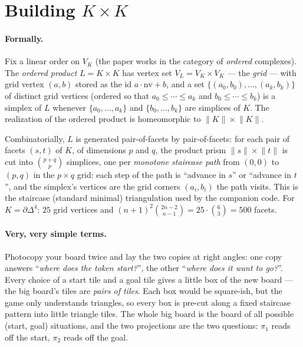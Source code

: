 \documentclass[11pt]{article}
\theoremstyle{definition}
\begin{document}
\section{Building $K \times K$}
\label{sec:product}

\paragraph{Formally.}
Fix a linear order on $V_K$ (the paper works in the category of \emph{ordered}
complexes). The \emph{ordered product} $L = K\times K$ has vertex set
$V_L = V_K \times V_K$ --- the \emph{grid} --- with grid vertex $(a,b)$ stored
as the id $a\cdot\mathrm{nv}+b$, and a set
$\{(a_0,b_0), \dots, (a_k,b_k)\}$ of distinct grid vertices (ordered so that
$a_0 \leq \cdots \leq a_k$ and $b_0 \leq \cdots \leq b_k$) is a simplex of $L$
whenever $\{a_0,\dots,a_k\}$ and $\{b_0,\dots,b_k\}$ are simplices of $K$. The
realization of the ordered product is homeomorphic to
$\lVert K\rVert \times \lVert K\rVert$.

Combinatorially, $L$ is generated pair-of-facets by pair-of-facets: for each
pair of facets $(s, t)$ of $K$, of dimensions $p$ and $q$, the product prism
$\lVert s\rVert \times \lVert t\rVert$ is cut into
$\binom{p+q}{p}$ simplices, one per \emph{monotone staircase path} from
$(0,0)$ to $(p,q)$ in the $p\times q$ grid: each step of the path is
``advance in $s$'' or ``advance in $t$'', and the simplex's vertices are the
grid corners $(a_i, b_i)$ the path visits. This is the staircase (standard
minimal) triangulation used by the companion code. For $K = \partial\Delta^4$:
$25$ grid vertices and
$(n{+}1)^2\binom{2n-2}{n-1} = 25\cdot\binom{6}{3} = 500$ facets.

\paragraph{Very, very simple terms.}
Photocopy your board twice and lay the two copies at right angles: one copy
answers ``\emph{where does the token start?}'', the other ``\emph{where does
it want to go?}''. Every choice of a start tile and a goal tile gives a little
box of the new board --- the big board's tiles are \emph{pairs of tiles}. Each
box would be square-ish, but the game only understands triangles, so every box
is pre-cut along a fixed staircase pattern into little triangle tiles. The
whole big board is the board of all possible (start, goal) situations, and the
two projections are the two questions: $\pi_1$ reads off the start,
$\pi_2$ reads off the goal.
\end{document}
